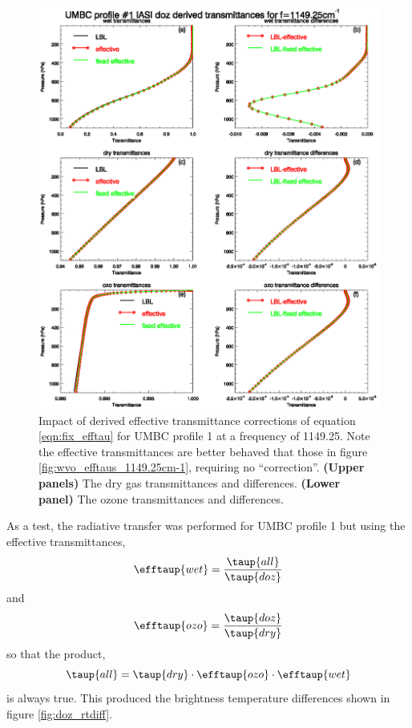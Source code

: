 \begin{figure}[htp]
  \centering
  \includegraphics[bb=70 130 540 480,clip,scale=0.8]{graphics/doz_efftaus_1149.25cm-1.eps}
  \caption{Impact of  derived effective transmittance corrections of equation \ref{eqn:fix_efftau} for UMBC profile 1 at a frequency of 1149.25\invcm. Note the effective transmittances are better behaved that those in figure \ref{fig:wvo_efftaus_1149.25cm-1}, requiring no ``correction''. \textbf{(Upper panels)} The dry gas transmittances and differences. \textbf{(Lower panel)} The ozone transmittances and differences.}
  \label{fig:doz_efftaus_1149.25cm-1}
\end{figure}

As a test, the radiative transfer was performed for UMBC profile 1 but using the effective transmittances,
\begin{equation}
  \efftaup{wet} = \frac{\taup{all}}{\taup{doz}}
  \label{eqn:tau_doz_effwet}
\end{equation}
and
\begin{equation}
  \efftaup{ozo} = \frac{\taup{doz}}{\taup{dry}}
  \label{eqn:tau_doz_effozo}
\end{equation}
so that the product,
\begin{equation}
  \taup{all} = \taup{dry}\cdot\efftaup{ozo}\cdot\efftaup{wet}
  \label{eqn:tau_doz_all}
\end{equation}
is always true. This produced the brightness temperature differences shown in figure \ref{fig:doz_rtdiff}.

